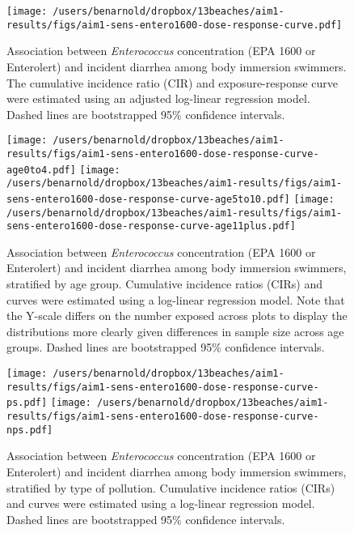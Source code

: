 \documentclass[12pt]{article}\usepackage[]{graphicx}\usepackage[]{color}
\begin{document}
\begin{figure}[h!tb]
\begin{center}
\texttt{[image: /users/benarnold/dropbox/13beaches/aim1-results/figs/aim1-sens-entero1600-dose-response-curve.pdf]}
\caption{Association between \emph{Enterococcus} concentration (EPA 1600 or Enterolert) and incident diarrhea among body immersion swimmers. The cumulative incidence ratio (CIR) and exposure-response curve were estimated using an adjusted log-linear regression model.  Dashed lines are bootstrapped 95\% confidence intervals. \label{fig:entero1600curve}}
\end{center}
\end{figure}


\begin{landscape}
\begin{figure}[h!tb]
\begin{center}
\texttt{[image: /users/benarnold/dropbox/13beaches/aim1-results/figs/aim1-sens-entero1600-dose-response-curve-age0to4.pdf]}
\texttt{[image: /users/benarnold/dropbox/13beaches/aim1-results/figs/aim1-sens-entero1600-dose-response-curve-age5to10.pdf]}
\texttt{[image: /users/benarnold/dropbox/13beaches/aim1-results/figs/aim1-sens-entero1600-dose-response-curve-age11plus.pdf]}
\caption{Association between \emph{Enterococcus} concentration (EPA 1600 or Enterolert) and incident diarrhea among body immersion swimmers, stratified by age group. Cumulative incidence ratios (CIRs) and curves were estimated using a log-linear regression model. Note that the Y-scale differs on the number exposed across plots to display the distributions more clearly given differences in sample size across age groups. Dashed lines are bootstrapped 95\% confidence intervals.  \label{fig:entero1600agecurve}}
\end{center}
\end{figure}
\end{landscape}

\begin{landscape}
\begin{figure}[h!tb]
\begin{center}
\texttt{[image: /users/benarnold/dropbox/13beaches/aim1-results/figs/aim1-sens-entero1600-dose-response-curve-ps.pdf]}
\texttt{[image: /users/benarnold/dropbox/13beaches/aim1-results/figs/aim1-sens-entero1600-dose-response-curve-nps.pdf]}
\caption{Association between \emph{Enterococcus} concentration (EPA 1600 or Enterolert) and incident diarrhea among body immersion swimmers, stratified by type of pollution. Cumulative incidence ratios (CIRs) and curves were estimated using a log-linear regression model. Dashed lines are bootstrapped 95\% confidence intervals.  \label{fig:entero1600pscurve}}
\end{center}
\end{figure}
\end{landscape}
\end{document}
